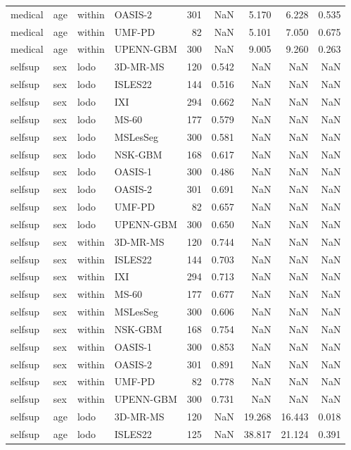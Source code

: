 \begin{tabular}{llllrrrrr}
medical & age & within & OASIS-2 & 301 & NaN & 5.170 & 6.228 & 0.535 \\
medical & age & within & UMF-PD & 82 & NaN & 5.101 & 7.050 & 0.675 \\
medical & age & within & UPENN-GBM & 300 & NaN & 9.005 & 9.260 & 0.263 \\
selfsup & sex & lodo & 3D-MR-MS & 120 & 0.542 & NaN & NaN & NaN \\
selfsup & sex & lodo & ISLES22 & 144 & 0.516 & NaN & NaN & NaN \\
selfsup & sex & lodo & IXI & 294 & 0.662 & NaN & NaN & NaN \\
selfsup & sex & lodo & MS-60 & 177 & 0.579 & NaN & NaN & NaN \\
selfsup & sex & lodo & MSLesSeg & 300 & 0.581 & NaN & NaN & NaN \\
selfsup & sex & lodo & NSK-GBM & 168 & 0.617 & NaN & NaN & NaN \\
selfsup & sex & lodo & OASIS-1 & 300 & 0.486 & NaN & NaN & NaN \\
selfsup & sex & lodo & OASIS-2 & 301 & 0.691 & NaN & NaN & NaN \\
selfsup & sex & lodo & UMF-PD & 82 & 0.657 & NaN & NaN & NaN \\
selfsup & sex & lodo & UPENN-GBM & 300 & 0.650 & NaN & NaN & NaN \\
selfsup & sex & within & 3D-MR-MS & 120 & 0.744 & NaN & NaN & NaN \\
selfsup & sex & within & ISLES22 & 144 & 0.703 & NaN & NaN & NaN \\
selfsup & sex & within & IXI & 294 & 0.713 & NaN & NaN & NaN \\
selfsup & sex & within & MS-60 & 177 & 0.677 & NaN & NaN & NaN \\
selfsup & sex & within & MSLesSeg & 300 & 0.606 & NaN & NaN & NaN \\
selfsup & sex & within & NSK-GBM & 168 & 0.754 & NaN & NaN & NaN \\
selfsup & sex & within & OASIS-1 & 300 & 0.853 & NaN & NaN & NaN \\
selfsup & sex & within & OASIS-2 & 301 & 0.891 & NaN & NaN & NaN \\
selfsup & sex & within & UMF-PD & 82 & 0.778 & NaN & NaN & NaN \\
selfsup & sex & within & UPENN-GBM & 300 & 0.731 & NaN & NaN & NaN \\
selfsup & age & lodo & 3D-MR-MS & 120 & NaN & 19.268 & 16.443 & 0.018 \\
selfsup & age & lodo & ISLES22 & 125 & NaN & 38.817 & 21.124 & 0.391 \\

\end{tabular}
